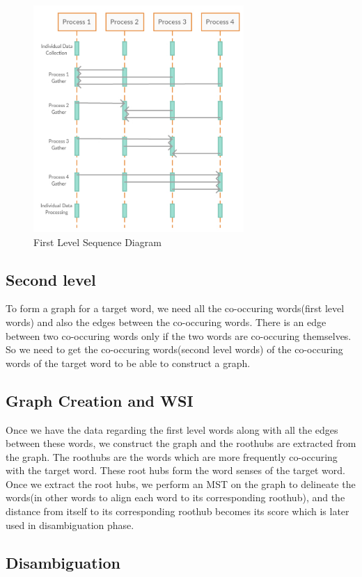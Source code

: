 \documentclass[article,dr=phil,type=drfinal,colorback,accentcolor=tud9c]{tudthesis}
\begin{document}
\begin{figure}[htb]
\centering
\includegraphics[page=1,width=80mm]{sequence1.pdf}
\caption[First Level Sequence Diagram]{First Level Sequence Diagram}
	\label{fig:seq1}
\end{figure}

\newpage
\subsection{Second level}
To form a graph for a target word, we need all the co-occuring words(first level words) and also the edges between the co-occuring words. There is an edge between two co-occuring words only if the two words are co-occuring themselves. So we need to get the co-occuring words(second level words) of the co-occuring words of the target word to be able to construct a graph.

\newpage
\subsection{Graph Creation and WSI}
Once we have the data regarding the first level words along with all the edges between these words, we construct the graph and the roothubs are extracted from the graph. The roothubs are the words which are more frequently co-occuring with the target word. These root hubs form the word senses of the target word. Once we extract the root hubs, we perform an MST on the graph to delineate the words(in other words to align each word to its corresponding roothub), and the distance from itself to its corresponding roothub becomes its score which is later used in disambiguation phase.

\newpage
\subsection{Disambiguation}
\end{document}
